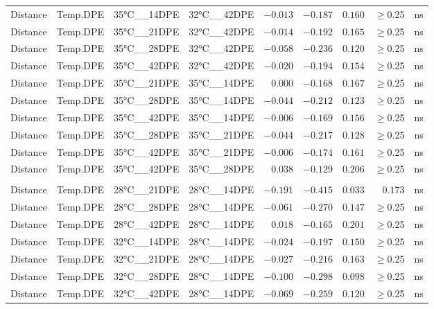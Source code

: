 \documentclass[
]{article}
\begin{document}
\begin{longtable}{llllrrrrl}
Distance & Temp.DPE & 35°C\_\_14DPE & 32°C\_\_42DPE & $-0.013$ & $-0.187$ & $0.160$ & $\geq$0.25 & ns \\ 
Distance & Temp.DPE & 35°C\_\_21DPE & 32°C\_\_42DPE & $-0.014$ & $-0.192$ & $0.165$ & $\geq$0.25 & ns \\ 
Distance & Temp.DPE & 35°C\_\_28DPE & 32°C\_\_42DPE & $-0.058$ & $-0.236$ & $0.120$ & $\geq$0.25 & ns \\ 
Distance & Temp.DPE & 35°C\_\_42DPE & 32°C\_\_42DPE & $-0.020$ & $-0.194$ & $0.154$ & $\geq$0.25 & ns \\ 
Distance & Temp.DPE & 35°C\_\_21DPE & 35°C\_\_14DPE & $0.000$ & $-0.168$ & $0.167$ & $\geq$0.25 & ns \\ 
Distance & Temp.DPE & 35°C\_\_28DPE & 35°C\_\_14DPE & $-0.044$ & $-0.212$ & $0.123$ & $\geq$0.25 & ns \\ 
Distance & Temp.DPE & 35°C\_\_42DPE & 35°C\_\_14DPE & $-0.006$ & $-0.169$ & $0.156$ & $\geq$0.25 & ns \\ 
Distance & Temp.DPE & 35°C\_\_28DPE & 35°C\_\_21DPE & $-0.044$ & $-0.217$ & $0.128$ & $\geq$0.25 & ns \\ 
Distance & Temp.DPE & 35°C\_\_42DPE & 35°C\_\_21DPE & $-0.006$ & $-0.174$ & $0.161$ & $\geq$0.25 & ns \\ 
Distance & Temp.DPE & 35°C\_\_42DPE & 35°C\_\_28DPE & $0.038$ & $-0.129$ & $0.206$ & $\geq$0.25 & ns \\ 
\midrule\addlinespace[2.5pt]
\multicolumn{9}{l}{gunifrac} \\ 
\midrule\addlinespace[2.5pt]
Distance & Temp.DPE & 28°C\_\_21DPE & 28°C\_\_14DPE & $-0.191$ & $-0.415$ & $0.033$ & $0.173$ & ns \\ 
Distance & Temp.DPE & 28°C\_\_28DPE & 28°C\_\_14DPE & $-0.061$ & $-0.270$ & $0.147$ & $\geq$0.25 & ns \\ 
Distance & Temp.DPE & 28°C\_\_42DPE & 28°C\_\_14DPE & $0.018$ & $-0.165$ & $0.201$ & $\geq$0.25 & ns \\ 
Distance & Temp.DPE & 32°C\_\_14DPE & 28°C\_\_14DPE & $-0.024$ & $-0.197$ & $0.150$ & $\geq$0.25 & ns \\ 
Distance & Temp.DPE & 32°C\_\_21DPE & 28°C\_\_14DPE & $-0.027$ & $-0.216$ & $0.163$ & $\geq$0.25 & ns \\ 
Distance & Temp.DPE & 32°C\_\_28DPE & 28°C\_\_14DPE & $-0.100$ & $-0.298$ & $0.098$ & $\geq$0.25 & ns \\ 
Distance & Temp.DPE & 32°C\_\_42DPE & 28°C\_\_14DPE & $-0.069$ & $-0.259$ & $0.120$ & $\geq$0.25 & ns \\ 

\end{longtable}
\end{document}
